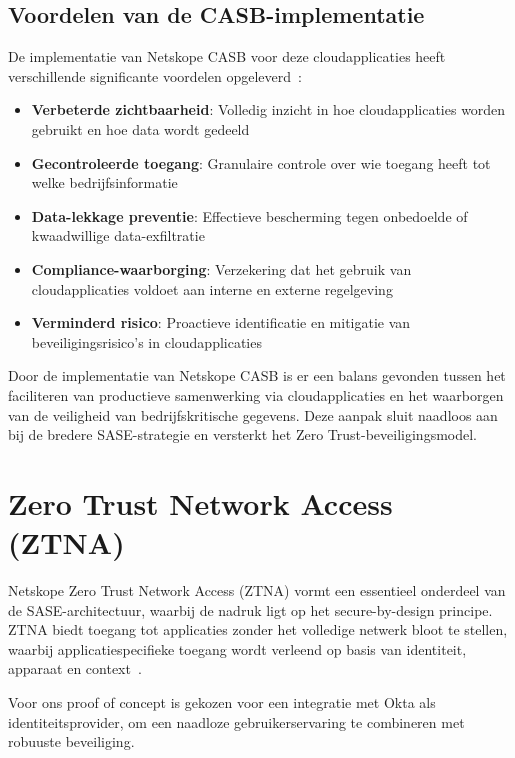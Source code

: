 \subsection{Voordelen van de CASB-implementatie}

De implementatie van Netskope CASB voor deze cloudapplicaties heeft verschillende significante voordelen opgeleverd~\autocite{Netskope2025-4}:
\begin{itemize}
    \item \textbf{Verbeterde zichtbaarheid}: Volledig inzicht in hoe cloudapplicaties worden gebruikt en hoe data wordt gedeeld
    \item \textbf{Gecontroleerde toegang}: Granulaire controle over wie toegang heeft tot welke bedrijfsinformatie
    \item \textbf{Data-lekkage preventie}: Effectieve bescherming tegen onbedoelde of kwaadwillige data-exfiltratie
    \item \textbf{Compliance-waarborging}: Verzekering dat het gebruik van cloudapplicaties voldoet aan interne en externe regelgeving
    \item \textbf{Verminderd risico}: Proactieve identificatie en mitigatie van beveiligingsrisico's in cloudapplicaties
\end{itemize}

Door de implementatie van Netskope CASB is er een balans gevonden tussen het faciliteren van productieve samenwerking via cloudapplicaties en het waarborgen van de veiligheid van bedrijfskritische gegevens. Deze aanpak sluit naadloos aan bij de bredere SASE-strategie en versterkt het Zero Trust-beveiligingsmodel.

\section{Zero Trust Network Access (ZTNA)}
Netskope Zero Trust Network Access (ZTNA) vormt een essentieel onderdeel van de SASE-architectuur, waarbij de nadruk ligt op het secure-by-design principe. ZTNA biedt toegang tot applicaties zonder het volledige netwerk bloot te stellen, waarbij applicatiespecifieke toegang wordt verleend op basis van identiteit, apparaat en context~\autocite{Netskope2025-5}. 

\vspace{2ex}

Voor ons proof of concept is gekozen voor een integratie met Okta als identiteitsprovider, om een naadloze gebruikerservaring te combineren met robuuste beveiliging.

